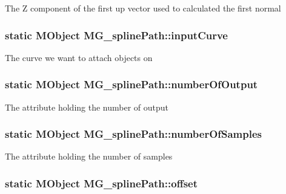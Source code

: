 The Z component of the first up vector used to calculated the first normal \hypertarget{class_m_g__spline_path_a553b49d795fe24494b5d6861f49c41b4}{
\subsubsection[{input\-Curve}]{\setlength{\rightskip}{0pt plus 5cm}static M\-Object M\-G\-\_\-spline\-Path\-::input\-Curve\hspace{0.3cm}{\ttfamily [static]}}}\label{class_m_g__spline_path_a553b49d795fe24494b5d6861f49c41b4}
The curve we want to attach objects on \hypertarget{class_m_g__spline_path_a494bdb0e752130afd6fac3a170a5ffe1}{
\subsubsection[{number\-Of\-Output}]{\setlength{\rightskip}{0pt plus 5cm}static M\-Object M\-G\-\_\-spline\-Path\-::number\-Of\-Output\hspace{0.3cm}{\ttfamily [static]}}}\label{class_m_g__spline_path_a494bdb0e752130afd6fac3a170a5ffe1}
The attribute holding the number of output \hypertarget{class_m_g__spline_path_a97e85208d383234fe180c6a6bfd18e97}{
\subsubsection[{number\-Of\-Samples}]{\setlength{\rightskip}{0pt plus 5cm}static M\-Object M\-G\-\_\-spline\-Path\-::number\-Of\-Samples\hspace{0.3cm}{\ttfamily [static]}}}\label{class_m_g__spline_path_a97e85208d383234fe180c6a6bfd18e97}
The attribute holding the number of samples \hypertarget{class_m_g__spline_path_a2a916661aacb9aa85aeffdbadbaee625}{
\subsubsection[{offset}]{\setlength{\rightskip}{0pt plus 5cm}static M\-Object M\-G\-\_\-spline\-Path\-::offset\hspace{0.3cm}{\ttfamily [static]}}}\label{class_m_g__spline_path_a2a916661aacb9aa85aeffdbadbaee625}
